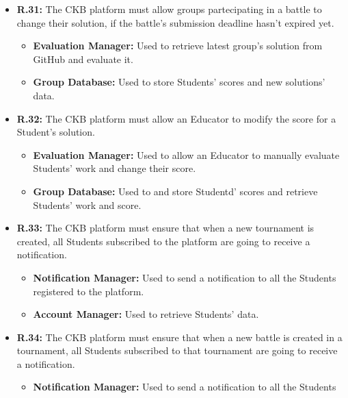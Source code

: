 \documentclass{article}
\begin{document}
{\begin{itemize}
\begin{itemize}
              overwrite Students' score according to it.
              \item \textbf{Group Database:} Used to store Students' scores and new solutions' data.
          \end{itemize}
    \item \textbf{R.31:} The CKB platform must allow groups partecipating in a battle to change their solution,
          if the battle's submission deadline hasn't expired yet.
          \begin{itemize}
            \item \textbf{Evaluation Manager:} Used to retrieve latest group's solution from GitHub and evaluate it.
              \item \textbf{Group Database:} Used to store Students' scores and new solutions' data.
          \end{itemize}
    \item \textbf{R.32:} The CKB platform must allow an Educator to modify the score for a Student's solution.
          \begin{itemize}
              \item \textbf{Evaluation Manager:} Used to allow an Educator to manually evaluate Students'
              work and change their score.
              \item \textbf{Group Database:} Used to and store Studentd' scores and retrieve Students' work and score.
          \end{itemize}
    \item \textbf{R.33:} The CKB platform must ensure that when a new tournament is created, all
          Students subscribed to the platform are going to receive a notification.
          \begin{itemize}
              \item \textbf{Notification Manager:} Used to send a notification to all the Students
              registered to the platform.
              \item \textbf{Account Manager:} Used to retrieve Students' data.
          \end{itemize}
    \item \textbf{R.34:} The CKB platform must ensure that when a new battle is created in a tournament,
          all Students subscribed to that tournament are going to receive a notification.
          \begin{itemize}
              \item \textbf{Notification Manager:} Used to send a notification to all the Students

\end{itemize}
\end{itemize}}
\end{document}
